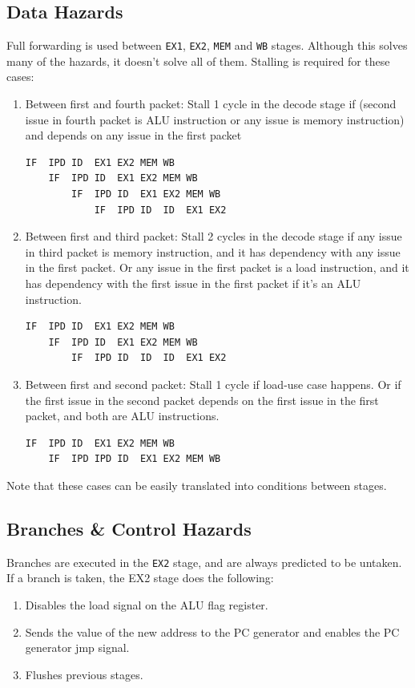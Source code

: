 \documentclass[12pt]{article}
\begin{document}
\subsection{Data Hazards}
Full forwarding is used between \texttt{EX1}, \texttt{EX2}, \texttt{MEM} and \texttt{WB} stages. Although this solves many of the hazards, it doesn't solve all of them. Stalling is required for these cases:
\begin{enumerate}
\item Between first and fourth packet: Stall 1 cycle in the decode stage if (second issue in fourth packet is ALU instruction or any issue is memory instruction) and depends on any issue in the first packet
\begin{lstlisting}
IF	IPD	ID	EX1	EX2	MEM	WB
	IF	IPD	ID	EX1	EX2	MEM	WB
		IF	IPD	ID	EX1	EX2	MEM	WB
			IF	IPD	ID	ID	EX1	EX2
\end{lstlisting}

\item Between first and third packet: Stall 2 cycles in the decode stage if any issue in third packet is memory instruction, and it has dependency with any issue in the first packet. Or any issue in the first packet is a load instruction, and it has dependency with the first issue in the first packet if it's an ALU instruction.
\begin{lstlisting}
IF	IPD	ID	EX1	EX2	MEM	WB
	IF	IPD	ID	EX1	EX2	MEM	WB
		IF	IPD	ID	ID	ID	EX1	EX2
\end{lstlisting}
\item Between first and second packet: Stall 1 cycle if load-use case happens. Or if the first issue in the second packet depends on the first issue in the first packet, and both are ALU instructions.
\begin{lstlisting}
IF	IPD	ID	EX1	EX2	MEM	WB
	IF	IPD	IPD	ID	EX1	EX2	MEM	WB
\end{lstlisting}
\end{enumerate}
Note that these cases can be easily translated into conditions between stages.

\subsection{Branches \& Control Hazards}
Branches are executed in the \texttt{EX2} stage, and are always predicted to be untaken. If a branch is taken, the EX2 stage does the following:
\begin{enumerate}
\item Disables the load signal on the ALU flag register.
\item Sends the value of the new address to the PC generator and enables the PC generator jmp signal.
\item Flushes previous stages.
\end{enumerate}
\end{document}
